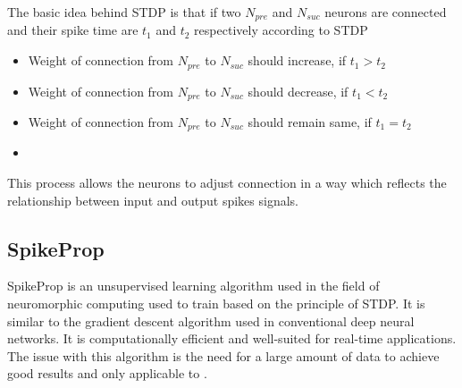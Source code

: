 The basic idea behind STDP is that if two $N_{pre}$ and $N_{suc}$ neurons are
connected and their spike time are $t_1$ and $t_2$ respectively according to
STDP \vspace*{-.3pc}
\begin{itemize}
    \item[]Weight of connection from $N_{pre}$ to $N_{suc}$ should  increase, if {\boldmath $t_1>t_2$}
    \item[]Weight of connection from $N_{pre}$ to $N_{suc}$ should  decrease, if {\boldmath $t_1<t_2$}
    \item[]Weight of connection from $N_{pre}$ to $N_{suc}$ should  remain same, if {\boldmath$t_1=t_2$}
    \item[]
\end{itemize}
\vspace*{-2.5pc}
This process allows the neurons to adjust connection in a way which reflects
the relationship between input and output spikes signals.
\subsection{SpikeProp}
SpikeProp is an unsupervised learning algorithm used in the field of
neuromorphic computing used to train \Snn based on the principle of STDP. It is
similar to the gradient descent algorithm used in conventional deep neural
networks. It is computationally efficient and well-suited for real-time
applications. The issue with this algorithm is the need for a large amount of
data to achieve good results and only applicable to \Snn.




